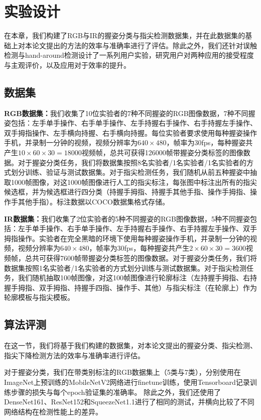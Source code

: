 \chapter{实验设计}

在本章，我们构建了RGB与IR的握姿分类与指尖检测数据集，并在此数据集的基础上对本论文提出的方法的效率与准确率进行了评估。除此之外，我们还针对误触检测与hand-around检测设计了一系列用户实验，研究用户对两种应用的接受程度与主观评价，以及应用对于效率的提升。

\section{数据集}

\textbf{RGB数据集：}我们收集了10位实验者的7种不同握姿的RGB图像数据，7种不同握姿包括：左手单手操作、右手单手操作、左手持握右手操作、右手持握左手操作、双手拇指操作、左手横向持握、右手横向持握。每位实验者要求使用每种握姿操作手机，并录制一分钟的视频，视频分辨率为$640 \times 480$，帧率为30fps，每种握姿共产生$10 \times 60 \times 30=18000$视频帧，总共可获得126000帧带握姿分类标签的图像数据。对于握姿分类任务，我们将数据集按照8名实验者/1名实验者/1名实验者的方式划分训练、验证与测试数据集。对于指尖检测任务，我们随机从前五种握姿中抽取1000帧图像，对这1000帧图像进行人工的指尖标注，每张图中标注出所有的指尖候选框，并为候选框进行四分类（持握手拇指、持握手其他手指、操作手拇指、操作手其他手指）。标注数据以COCO数据集格式存储。

\textbf{IR数据集：}我们收集了2位实验者的5种不同握姿的RGB图像数据，5种不同握姿包括：左手单手操作、右手单手操作、左手持握右手操作、右手持握左手操作、双手拇指操作。实验者在完全黑暗的环境下使用每种握姿操作手机，并录制一分钟的视频，视频分辨率为$640 \times 480$，帧率为30fps，每种握姿共产生$2 \times 60 \times 30=3600$视频帧，总共可获得7600帧带握姿分类标签的图像数据。对于握姿分类任务，我们将数据集按照1名实验者/1名实验者的方式划分训练与测试数据集。对于指尖检测任务，我们随机抽取100帧图像，对这100帧图像进行轮廓标注（左持握手拇指、右持握手拇指、双手拇指、持握手四指、操作手、其他）与指尖标注（在轮廓上）作为轮廓模板与指尖模板。

\section{算法评测}
在这一节，我们将基于我们构建的数据集，对本论文提出的握姿分类、指尖检测、指尖下降检测方法的效率与准确率进行评估。



对于握姿分类，我们在带类别标注的RGB数据集上（5类与7类），分别使用在ImageNet上预训练的MobileNetV2网络进行finetune训练，使用Tensorboard记录训练步骤的损失与每个epoch验证集的准确率。
除此之外，我们还使用了DenseNet161、ResNet152和SqueezeNet1.1进行了相同的测试，并横向比较了不同网络结构在检测性能上的差异。


